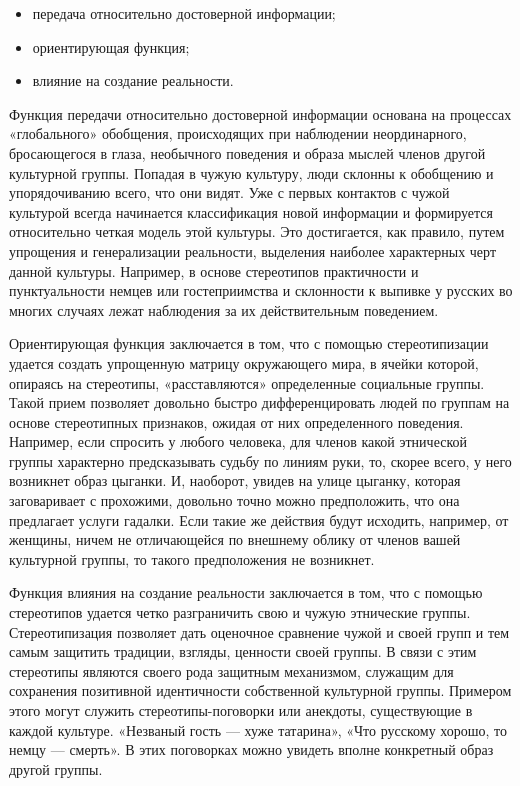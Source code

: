 \documentclass[14pt, a4paper] {ncc}
\begin{document}
	\begin{itemize}
    	\item передача относительно достоверной информации;
    	\item ориентирующая функция;
    	\item влияние на создание реальности.
	\end{itemize}
    Функция передачи относительно достоверной информации основана на процессах
    «глобального» обобщения, происходящих при наблюдении неординарного,
    бросающегося в глаза, необычного поведения и образа мыслей членов другой
    культурной группы. Попадая в чужую культуру, люди склонны к обобщению и
    упорядочиванию всего, что они видят. Уже с первых контактов с чужой культурой
    всегда начинается классификация новой информации и формируется относительно
    четкая модель этой культуры. Это достигается, как правило, путем упрощения
    и генерализации реальности, выделения наиболее характерных черт данной
    культуры. Например, в основе стереотипов практичности и пунктуальности немцев
    или гостеприимства и склонности к выпивке у русских во многих случаях лежат
    наблюдения за их действительным поведением.

    Ориентирующая функция заключается в том, что с помощью стереотипизации
    удается создать упрощенную матрицу окружающего мира, в ячейки которой,
    опираясь на стереотипы, «расставляются» определенные социальные группы. Такой
    прием позволяет довольно быстро дифференцировать людей по группам на основе
    стереотипных признаков, ожидая от них определенного поведения. Например, если
    спросить у любого человека, для членов какой этнической группы характерно
    предсказывать судьбу по линиям руки, то, скорее всего, у него возникнет образ
    цыганки. И, наоборот, увидев на улице цыганку, которая заговаривает с прохожими,
    довольно точно можно предположить, что она предлагает услуги гадалки. Если
    такие же действия будут исходить, например, от женщины, ничем не отличающейся
    по внешнему облику от членов вашей культурной группы, то такого предположения
    не возникнет.

    Функция влияния на создание реальности заключается в том, что с
    помощью стереотипов удается четко разграничить свою и чужую этнические
    группы. Стереотипизация позволяет дать оценочное сравнение чужой и своей
    групп и тем самым защитить традиции, взгляды, ценности своей группы. В связи
    с этим стереотипы являются своего рода защитным механизмом, служащим для
    сохранения позитивной идентичности собственной культурной группы. Примером
    этого могут служить стереотипы-поговорки или анекдоты, существующие в каждой
    культуре. «Незваный гость — хуже татарина», «Что русскому хорошо, то немцу —
    смерть». В этих поговорках можно увидеть вполне конкретный образ другой группы.\cite{Sadoh2}
\end{document}
